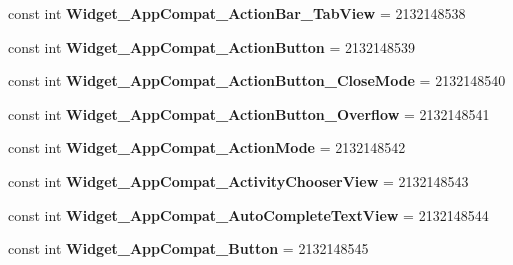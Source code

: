 \begin{DoxyCompactItemize}
\mbox{\label{classst_delivery_1_1_resource_1_1_style_ae6484bf398cc16684ac49fe914b0468e}} 
const int {\bfseries Widget\+\_\+\+App\+Compat\+\_\+\+Action\+Bar\+\_\+\+Tab\+View} = 2132148538
\item 
\mbox{\label{classst_delivery_1_1_resource_1_1_style_afd3eab8e468abacc8661a72ade3777c8}} 
const int {\bfseries Widget\+\_\+\+App\+Compat\+\_\+\+Action\+Button} = 2132148539
\item 
\mbox{\label{classst_delivery_1_1_resource_1_1_style_a36597030b941886ef642e30b5763ab79}} 
const int {\bfseries Widget\+\_\+\+App\+Compat\+\_\+\+Action\+Button\+\_\+\+Close\+Mode} = 2132148540
\item 
\mbox{\label{classst_delivery_1_1_resource_1_1_style_a09a049afc21ef084a15bcfa80a109c4e}} 
const int {\bfseries Widget\+\_\+\+App\+Compat\+\_\+\+Action\+Button\+\_\+\+Overflow} = 2132148541
\item 
\mbox{\label{classst_delivery_1_1_resource_1_1_style_a1b6e896f40ce0e881600ec155c1b77e9}} 
const int {\bfseries Widget\+\_\+\+App\+Compat\+\_\+\+Action\+Mode} = 2132148542
\item 
\mbox{\label{classst_delivery_1_1_resource_1_1_style_abf1784dbcab11acb62d35468f005cfb0}} 
const int {\bfseries Widget\+\_\+\+App\+Compat\+\_\+\+Activity\+Chooser\+View} = 2132148543
\item 
\mbox{\label{classst_delivery_1_1_resource_1_1_style_aaa792c7be1f16e01ecc5d9246296a672}} 
const int {\bfseries Widget\+\_\+\+App\+Compat\+\_\+\+Auto\+Complete\+Text\+View} = 2132148544
\item 
\mbox{\label{classst_delivery_1_1_resource_1_1_style_af72c14ff501ec7b5cd9eeb962394db17}} 
const int {\bfseries Widget\+\_\+\+App\+Compat\+\_\+\+Button} = 2132148545
\item 
\mbox{\label{classst_delivery_1_1_resource_1_1_style_a78abfa2fa5b5e8e5f04b2b5cb5d194bb}} 

\end{DoxyCompactItemize}
